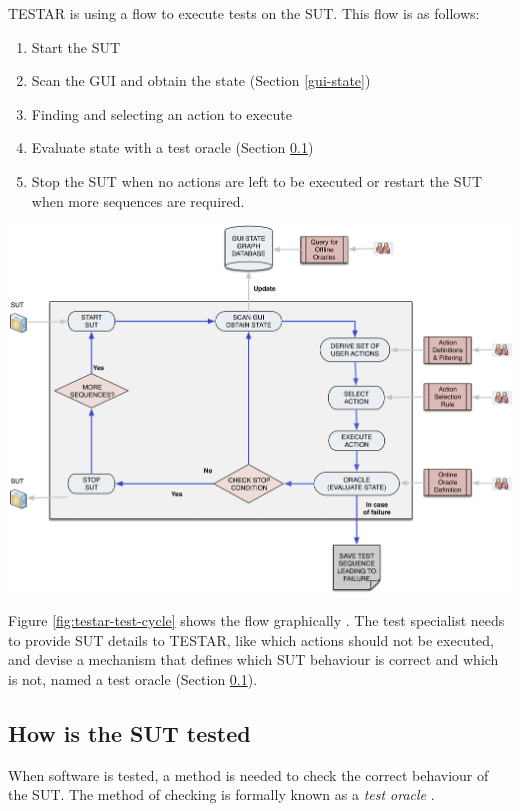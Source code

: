 TESTAR is using a flow to execute tests on the SUT. This flow is as follows:
\begin{samepage}
\begin{enumerate}
    \item Start the SUT
    \item Scan the GUI and obtain the state (Section \ref{gui-state})
    \item Finding and selecting an action to execute
    \item Evaluate state with a test oracle (Section \ref{test-oracles})
    \item Stop the SUT when no actions are left to be executed or restart the SUT when more sequences are required.
\end{enumerate}
\end{samepage}

\bigskip
\begingroup
\captionsetup{type=figure}
\includegraphics[scale=0.36]{images/testar-test-cycle.png}
\label{fig:testar-test-cycle}
\endgroup

Figure \ref{fig:testar-test-cycle} shows the flow graphically \cite{VosAho2021}. The test specialist needs to provide SUT details to TESTAR, like which actions should not be executed, and devise a mechanism that defines which SUT behaviour is correct and which is not, named a test oracle (Section \ref{test-oracles}). 

\subsection{How is the SUT tested} \label{test-oracles}
When software is tested, a method is needed to check the correct behaviour of the SUT. The method of checking is formally known as a \emph{test oracle} \cite{testOracles}. 

